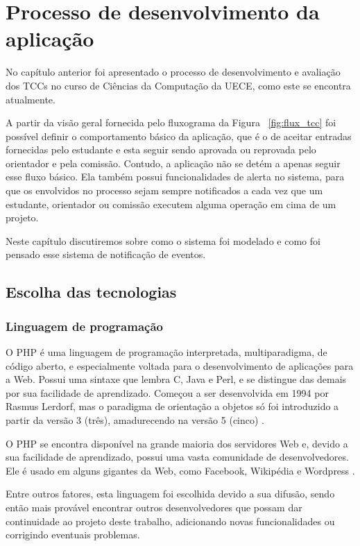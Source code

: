 \chapter{Processo de desenvolvimento da aplicação}
\label{cha:desenvolvimento}

No capítulo anterior foi apresentado o processo de desenvolvimento
e avaliação dos TCCs no curso de Ciências da Computação da UECE, como este se 
encontra atualmente. 

A partir da visão geral fornecida pelo fluxograma 
da Figura ~\ref{fig:flux_tcc} foi possível definir o comportamento básico 
da aplicação, que é o de aceitar entradas fornecidas pelo estudante e esta seguir sendo aprovada
ou reprovada pelo orientador e pela comissão. Contudo, a aplicação não se 
detém a apenas seguir esse fluxo básico. Ela também possui funcionalidades
de alerta no sistema, para que os envolvidos no processo sejam sempre 
notificados a cada vez que um estudante, orientador ou comissão executem alguma
operação em cima de um projeto.

Neste capítulo discutiremos sobre como o sistema foi modelado e como foi pensado
esse sistema de notificação de eventos.

\section{Escolha das tecnologias}
\subsection{Linguagem de programação}
O PHP é uma linguagem de programação interpretada, multiparadigma, de código aberto, e especialmente
voltada para o desenvolvimento de aplicações para a Web. Possui uma sintaxe que lembra
C, Java e Perl, e se distingue das demais por sua facilidade de aprendizado.
Começou a ser desenvolvida em 1994 por Rasmus Lerdorf, mas o paradigma de orientação
a objetos só foi introduzido a partir da versão 3 (três), amadurecendo na versão 5 (cinco) \cite{PHP, Wiki:PHP}.

O PHP se encontra disponível na grande maioria dos servidores Web e, devido a sua 
facilidade de aprendizado, possui uma vasta comunidade de desenvolvedores. Ele é 
usado em alguns gigantes da Web, como Facebook, Wikipédia e Wordpress \cite{InfoQ:Facebook, Wikipedia:Arquitetura, Wordpress}.

Entre outros fatores, esta linguagem foi escolhida devido a sua difusão, sendo então mais
provável encontrar outros desenvolvedores que possam dar continuidade ao projeto deste trabalho,
adicionando novas funcionalidades ou corrigindo eventuais problemas.

